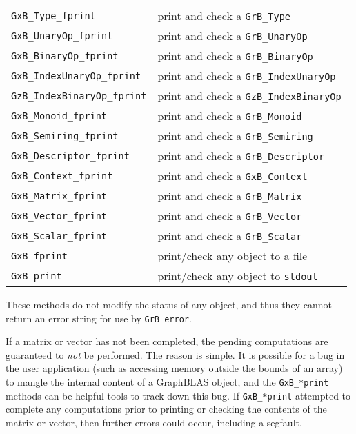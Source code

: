 \documentclass[12pt]{article}
\begin{document}
\vspace{0.2in}
{\footnotesize
\begin{tabular}{ll}
\hline
\verb'GxB_Type_fprint'         & print and check a \verb'GrB_Type' \\
\verb'GxB_UnaryOp_fprint'      & print and check a \verb'GrB_UnaryOp' \\
\verb'GxB_BinaryOp_fprint'     & print and check a \verb'GrB_BinaryOp' \\
\verb'GxB_IndexUnaryOp_fprint' & print and check a \verb'GrB_IndexUnaryOp' \\
\verb'GzB_IndexBinaryOp_fprint'& print and check a \verb'GzB_IndexBinaryOp' \\
\verb'GxB_Monoid_fprint'       & print and check a \verb'GrB_Monoid' \\
\verb'GxB_Semiring_fprint'     & print and check a \verb'GrB_Semiring' \\
\verb'GxB_Descriptor_fprint'   & print and check a \verb'GrB_Descriptor' \\
\verb'GxB_Context_fprint'      & print and check a \verb'GxB_Context' \\
\verb'GxB_Matrix_fprint'       & print and check a \verb'GrB_Matrix' \\
\verb'GxB_Vector_fprint'       & print and check a \verb'GrB_Vector' \\
\verb'GxB_Scalar_fprint'       & print and check a \verb'GrB_Scalar' \\
\hline
\verb'GxB_fprint'             & print/check any object to a file \\
\verb'GxB_print'              & print/check any object to \verb'stdout' \\
\hline
\end{tabular}
}
\vspace{0.2in}

These methods do not modify the status of any object, and thus they
cannot return an error string for use by \verb'GrB_error'.

If a matrix or vector
has not been completed, the pending computations are guaranteed to {\em not} be
performed. The reason is simple.  It is possible for a bug in the user
application (such as accessing memory outside the bounds of an array) to mangle
the internal content of a GraphBLAS object, and the \verb'GxB_*print' methods
can be helpful tools to track down this bug.  If \verb'GxB_*print' attempted to
complete any computations prior to printing or checking the contents of the
matrix or vector, then further errors could occur, including a segfault.
\end{document}
